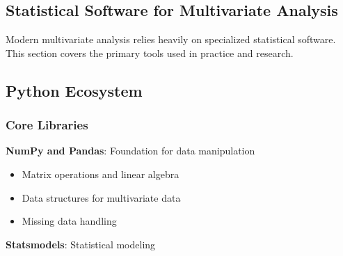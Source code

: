 \documentclass[
]{article}
\begin{document}
\textbf{ }

\subsection{Statistical Software for Multivariate Analysis}

Modern multivariate analysis relies heavily on specialized statistical
software. This section covers the primary tools used in practice and
research.

\textbf{ }

\subsection{Python Ecosystem}

\subsubsection{Core Libraries}

\textbf{NumPy and Pandas}: Foundation for data manipulation

\begin{itemize}
\item
  Matrix operations and linear algebra
\item
  Data structures for multivariate data
\item
  Missing data handling
\end{itemize}

\textbf{Statsmodels}: Statistical modeling

\begin{Shaded}
\begin{Highlighting}[]

\OperatorTok{=}\OperatorTok{=}
\OperatorTok{=}

\OperatorTok{=}\OperatorTok{=}
\end{Highlighting}
\end{Shaded}
\end{document}
